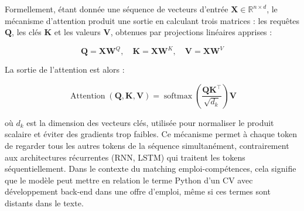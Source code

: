\documentclass[12pt,twoside]{report}
\newcommand{\R}{\mathbb{R}}
\newcommand{\mat}[1]{\mathbf{#1}}
\newcommand{\softmax}{\operatorname{softmax}}
\begin{document}
Formellement, étant donnée une séquence de vecteurs d'entrée $\mat{X} \in \R^{n \times d}$,
le mécanisme d'attention produit une sortie en calculant trois matrices : les requêtes $\mat{Q}$,
les clés $\mat{K}$ et les valeurs $\mat{V}$, obtenues par projections linéaires apprises :
 
\begin{equation}
  \mat{Q} = \mat{X}\mat{W}^Q, \quad
  \mat{K} = \mat{X}\mat{W}^K, \quad
  \mat{V} = \mat{X}\mat{W}^V
\end{equation}
 
La sortie de l'attention est alors :
 
\begin{equation}
  \operatorname{Attention}(\mat{Q}, \mat{K}, \mat{V})
  = \softmax\!\left(\frac{\mat{Q}\mat{K}^\top}{\sqrt{d_k}}\right)\mat{V}
  \label{eq:attention}
\end{equation}
 
où $d_k$ est la dimension des vecteurs clés, utilisée pour normaliser le produit scalaire
et éviter des gradients trop faibles. Ce mécanisme permet à chaque token de \og regarder \fg{}
tous les autres tokens de la séquence simultanément, contrairement aux architectures récurrentes
(RNN, LSTM) qui traitent les tokens séquentiellement.
Dans le contexte du matching
emploi-compétences, cela signifie que le modèle peut mettre en relation le terme \og Python \fg{}
d'un CV avec \og développement back-end \fg{} dans une offre d'emploi, même si ces termes
sont distants dans le texte.
\end{document}
